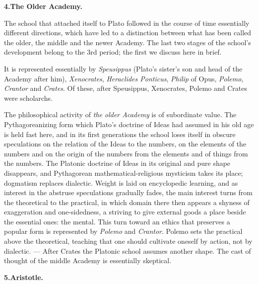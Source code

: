\divrule

\begin{center}
\textbf{4.\enspace The Older Academy.}
\end{center}

The school that attached itself to Plato followed in the course of
time essentially different directions, which have led to a
distinction between what has been called the older, the middle
and the newer Academy. The last two stages of the school's development
belong to the 3rd period; the first we discuss here in brief.

It is represented essentially by \emph{Speusippus} (Plato's
sister's son and head of the Academy after him), \emph{Xenocrates},
\emph{Heraclides Ponticus}, \emph{Philip} of Opus, \emph{Polemo},
\emph{Crantor} and \emph{Crates}. Of these, after Speusippus, Xenocrates, Polemo and Crates were scholarchs.

The philosophical activity of \emph{the older Academy} is of
subordinate value. The Pythagoreanizing form which Plato's doctrine of Ideas had assumed in his old age is held fast here,
and in its first generations the school loses itself in obscure speculations on the relation of the Ideas to the numbers, on the
elements of the numbers and on the origin of the numbers from the elements and
of things from the numbers. The Platonic doctrine of Ideas in its original
and pure shape disappears, and Pythagorean mathematical-religious mysticism takes its place; dogmatism replaces dialectic.
Weight is laid on encyclopedic learning, and as
interest in the abstruse speculations gradually fades, the
main interest turns from the theoretical to the practical, in
which domain there then appears a shyness of exaggeration and
one-sidedness, a striving to give external goods a place
beside the essential ones: the mental. This turn
toward an ethics that preserves a popular form is represented by
\emph{Polemo} and \emph{Crantor}. Polemo sets the practical above
the theoretical, teaching that one should cultivate oneself by
action, not by dialectic. --- After Crates the
Platonic school assumes another shape. The cast of thought of the middle Academy
is essentially skeptical.

\divrule

\begin{center}
\textbf{5.\enspace Aristotle.}
\end{center}

